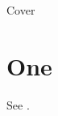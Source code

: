 \documentclass{book}
\begin{document}
\begin{center}{\Huge Cover}\end{center}
\chapter{One}
See \cite{w01}.
\backmatter


\end{document}

